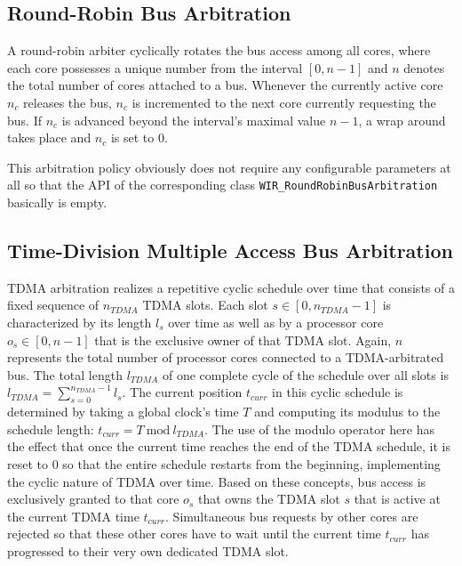 \subsection{Round-Robin Bus Arbitration}
\label{ssec:rrarbitration}

A round-robin arbiter cyclically rotates the bus access among all cores, where each core possesses a unique number from the interval $[0, \mathit{n}-1]$ and $\mathit{n}$ denotes the total number of cores attached to a bus.
Whenever the currently active core $\mathit{n}_\mathit{c}$ releases the bus, $\mathit{n}_\mathit{c}$ is incremented to the next core currently requesting the bus.
If $\mathit{n}_\mathit{c}$ is advanced beyond the interval's maximal value $\mathit{n}-1$, a wrap around takes place and $\mathit{n}_\mathit{c}$ is set to 0.

This arbitration policy obviously does not require any configurable parameters at all so that the \gls{API} of the corresponding class \texttt{WIR\_RoundRobinBusArbitration} basically is empty.


\subsection{Time-Division Multiple Access Bus Arbitration}
\label{ssec:tdmaarbitration}

\gls{TDMA} arbitration realizes a repetitive cyclic schedule over time that consists of a fixed sequence of $\mathit{n}_\mathit{TDMA}$ \gls{TDMA} slots.
Each slot $\mathit{s} \in [0, \mathit{n}_\mathit{TDMA}-1]$ is characterized by its length $\mathit{l}_\mathit{s}$ over time as well as by a processor core $\mathit{o}_\mathit{s} \in [0, \mathit{n}-1]$ that is the exclusive owner of that \gls{TDMA} slot.
Again, $\mathit{n}$ represents the total number of processor cores connected to a \gls{TDMA}-arbitrated bus.
The total length $\mathit{l}_\mathit{TDMA}$ of one complete cycle of the schedule over all slots is $\mathit{l}_\mathit{TDMA} = \sum_{\mathit{s}=0}^{\mathit{n}_\mathit{TDMA}-1}\mathit{l}_\mathit{s}$.
The current position $\mathit{t}_\mathit{curr}$ in this cyclic schedule is determined by taking a global clock's time $\mathit{T}$ and computing its modulus to the schedule length: $\mathit{t}_\mathit{curr} = \mathit{T}\ \textrm{mod}\ \mathit{l}_\mathit{TDMA}$.
The use of the modulo operator here has the effect that once the current time reaches the end of the \gls{TDMA} schedule, it is reset to 0 so that the entire schedule restarts from the beginning, implementing the cyclic nature of \gls{TDMA} over time.
Based on these concepts, bus access is exclusively granted to that core $\mathit{o}_\mathit{s}$ that owns the \gls{TDMA} slot $\mathit{s}$ that is active at the current \gls{TDMA} time $\mathit{t}_\mathit{curr}$.
Simultaneous bus requests by other cores are rejected so that these other cores have to wait until the current time $\mathit{t}_\mathit{curr}$ has progressed to their very own dedicated \gls{TDMA} slot.

